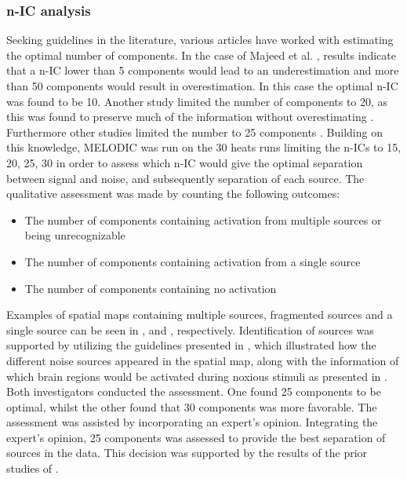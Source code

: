 \subsubsection{n-IC analysis}

Seeking guidelines in the literature, various articles have worked with estimating the optimal number of components. In the case of Majeed et al. \cite{Majeed2014}, results indicate that a n-IC lower than 5 components would lead to an underestimation and more than 50 components would result in overestimation. In this case the optimal n-IC was found to be 10. Another study limited the number of components to 20, as this was found to preserve much of the information without overestimating \cite{Calhoun2001}. Furthermore other studies limited the number to 25 components \cite{Kim2013,Erpelding2013}. Building on this knowledge, MELODIC was run on the 30 heats runs limiting the n-ICs to 15, 20, 25, 30 in order to assess which n-IC would give the optimal separation between signal and noise, and subsequently separation of each source. The qualitative assessment was made by counting the following outcomes: 
\begin{itemize}
	\item The number of components containing activation from multiple sources or being unrecognizable 
	\item The number of components containing activation from a single source 
	\item The number of components containing no activation    
\end{itemize}
 
Examples of spatial maps containing multiple sources, fragmented sources and a single source can be seen in ,  and , respectively. Identification of sources was supported by utilizing the guidelines presented in \cite{Griffanti2017}, which illustrated how the different noise sources appeared in the spatial map, along with the information of which brain regions would be activated during noxious stimuli as presented in . Both investigators conducted the assessment. One found 25 components to be optimal, whilst the other found that 30 components was more favorable. The assessment was assisted by incorporating an expert's opinion. Integrating the expert's opinion, 25 components was assessed to provide the best separation of sources in the data. This decision was supported by the results of the prior studies of \cite{Kim2013,Erpelding2013}.     

